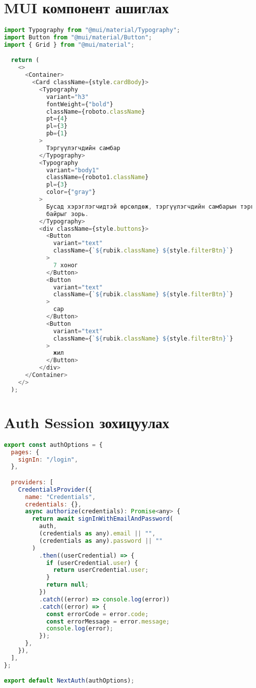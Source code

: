 \chapter{MUI компонент ашиглах}
\label{appendix:mui-component}

\begin{lstlisting}[language=Javascript, frame=single]
import Typography from "@mui/material/Typography";
import Button from "@mui/material/Button";
import { Grid } from "@mui/material";

  return (
    <>
      <Container>
        <Card className={style.cardBody}>
          <Typography
            variant="h3"
            fontWeight={"bold"}
            className={roboto.className}
            pt={4}
            pl={3}
            pb={1}
          >
            Тэргүүлэгчдийн самбар
          </Typography>
          <Typography
            variant="body1"
            className={roboto1.className}
            pl={3}
            color={"gray"}
          >
            Бусад хэрэглэгчидтэй өрсөлдөж, тэргүүлэгчдийн самбарын тэргүүн
            байрыг зорь.
          </Typography>
          <div className={style.buttons}>
            <Button
              variant="text"
              className={`${rubik.className} ${style.filterBtn}`}
            >
              7 хоног
            </Button>
            <Button
              variant="text"
              className={`${rubik.className} ${style.filterBtn}`}
            >
              сар
            </Button>
            <Button
              variant="text"
              className={`${rubik.className} ${style.filterBtn}`}
            >
              жил
            </Button>
          </div>
      </Container>
    </>
  );
\end{lstlisting}

\chapter{Auth Session зохицуулах}
\label{appendix:session-provider-implementation}

\begin{lstlisting}[language=Javascript, frame=single]
	export const authOptions = {
  pages: {
    signIn: "/login",
  },

  providers: [
    CredentialsProvider({
      name: "Credentials",
      credentials: {},
      async authorize(credentials): Promise<any> {
        return await signInWithEmailAndPassword(
          auth,
          (credentials as any).email || "",
          (credentials as any).password || ""
        )
          .then((userCredential) => {
            if (userCredential.user) {
              return userCredential.user;
            }
            return null;
          })
          .catch((error) => console.log(error))
          .catch((error) => {
            const errorCode = error.code;
            const errorMessage = error.message;
            console.log(error);
          });
      },
    }),
  ],
};

export default NextAuth(authOptions);


\end{lstlisting}


